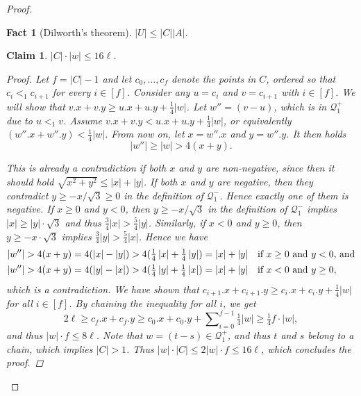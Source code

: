 \documentclass[a4paper,11pt]{article}
\newtheorem{fact}{Fact}[section]
\newtheorem{claim}{Claim}[section]
\newcommand{\Q}{\mathcal{Q}}
\newcommand{\absolute}[1]{\left\lvert#1\right\rvert}
\begin{document}
\begin{proof}
\begin{fact}[Dilworth's theorem]\label{dilworth}
	$\absolute{U} \le \absolute{C} \absolute{A}$.
\end{fact}

\begin{claim}\label{C_ineq}
	$\absolute{C} \cdot \absolute{w} \leq 16\ell$. 
	\begin{proof}
		Let $f = \absolute{C} - 1$ and
		let $c_0, \dots, c_{f}$ denote the points in $C$, ordered so that $c_i <_1 c_{i + 1}$ for every $i \in [f]$.
		Consider any $u = c_i$ and $v = c_{i + 1}$ with $i \in [f]$. We will show that $v.x + v.y \geq u.x + u.y + \frac14\absolute{w}$. 		
		Let $w'' = (v - u)$, which is in $\Q_1^+$ due to $u <_1 v$. Assume $v.x + v.y < u.x + u.y + \frac14\absolute{w}$, or equivalently $(w''.x + w''.y) < \frac14\absolute{w}$. From now on, let $x = w''.x$ and $y = w''.y$. It then holds $$\absolute{w''} \geq \absolute{w} > 4(x + y).$$
		
		This is already a contradiction if both $x$ and $y$ are non-negative, since then it should hold $\sqrt{x^2 + y^2} \leq \absolute{x} + \absolute{y}$. If both $x$ and $y$ are negative, then they contradict $y \geq -x/\sqrt{3} \geq 0$ in the definition of $\Q_1^-$. Hence exactly one of them is negative. If $x \geq 0$ and $y < 0$, then $y \geq -x / \sqrt{3}$ in the definition of $\Q_1^-$ implies $\absolute{x} \geq \absolute{y}\cdot \sqrt{3}$ and thus $\frac34\absolute{x} > \frac54\absolute{y}$. Similarly, if $x < 0$ and $y \geq 0$, then $y \geq -x \cdot \sqrt{3}$ implies $\frac34\absolute{y} > \frac54\absolute{x}$. Hence we have
	\begin{alignat*}{1}	
		\absolute{w''} > 4(x + y) = 
		4(\absolute{x} - \absolute{y}) > 
		4(\tfrac14\absolute{x} + \tfrac14\absolute{y}) = 
		\absolute{x} + \absolute{y}&\text{\quad if $x \geq 0$ and $y < 0$, and}\\
		\absolute{w''} > 4(x + y) = 
		4(\absolute{y} - \absolute{x}) > 
		4(\tfrac14\absolute{y} + \tfrac14\absolute{x}) = 
		\absolute{x} + \absolute{y}&\text{\quad if $x < 0$ and $y \geq 0$,}
	\end{alignat*}
	which is a contradiction.
	We have shown that $c_{i + 1}.x + c_{i + 1}.y \geq c_i.x + c_i.y + \frac14\absolute{w}$ for all $i \in [f]$. By chaining the inequality for all $i$, we get $$2\ell \geq c_f.x + c_f.y \geq c_0.x + c_0.y + \sum\nolimits_{i = 0}^{f - 1} \tfrac14\absolute{w} \geq \tfrac14f\cdot{\absolute{w}},$$ and thus $\absolute{w} \cdot f \leq 8\ell$. Note that $w = (t - s) \in \Q_1^+$, and thus $t$ and $s$ belong to a chain, which implies $\absolute{C} > 1$. Thus $\absolute{w} \cdot \absolute{C} \leq 2\absolute{w} \cdot f \leq 16\ell$, which concludes the proof.
	\end{proof}%
\end{claim}


\end{proof}
\end{document}
